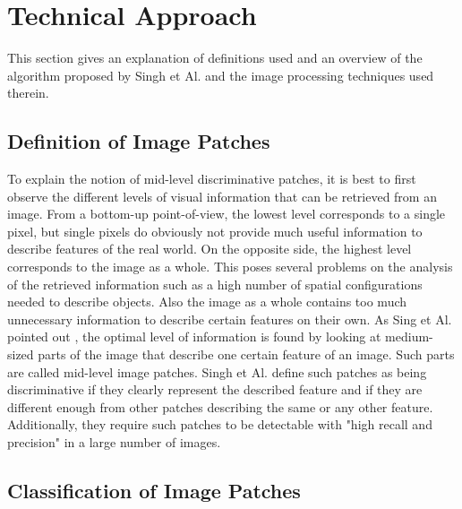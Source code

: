 
\section{Technical Approach}\label{sec:StateArt}

This section gives an explanation of definitions used and an overview of the algorithm proposed by Singh et Al. \cite{Singh2012DiscPat} and the image processing techniques used therein.

\subsection{Definition of Image Patches}

To explain the notion of mid-level discriminative patches, it is best to first observe the different levels of visual information that can be retrieved from an image. From a bottom-up point-of-view, the lowest level corresponds to a single pixel, but single pixels do obviously not provide much useful information to describe features of the real world. On the opposite side, the highest level corresponds to the image as a whole. This poses several problems on the analysis of the retrieved information such as a high number of spatial configurations needed to describe objects. Also the image as a whole contains too much unnecessary information to describe certain features on their own. As Sing et Al. pointed out \cite{Singh2012DiscPat}, the optimal level of information is found by looking at medium-sized parts of the image that describe one certain feature of an image. Such parts are called mid-level image patches. Singh et Al. \cite{Singh2012DiscPat} define such patches as being discriminative if they clearly represent the described feature and if they are different enough from other patches describing the same or any other feature. Additionally, they require such patches to be detectable with "high recall and precision" in a large number of images.

\subsection{Classification of Image Patches}


